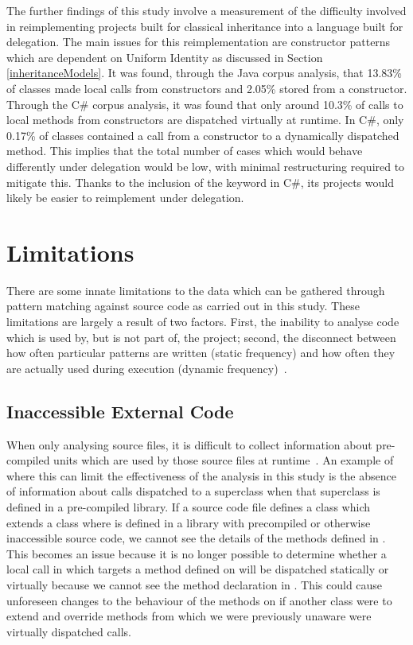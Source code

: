 The further findings of this study involve a measurement of the difficulty involved in reimplementing projects built for classical inheritance into a language built for delegation. The main issues for this reimplementation are constructor patterns which are dependent on Uniform Identity as discussed in Section \ref{inheritanceModels}. It was found, through the Java corpus analysis, that 13.83\% of classes made local calls from constructors and 2.05\% stored  from a constructor. Through the C\# corpus analysis, it was found that only around 10.3\% of calls to local methods from constructors are dispatched virtually at runtime. In C\#, only 0.17\% of classes contained a call from a constructor to a dynamically dispatched method. This implies that the total number of cases which would behave differently under delegation would be low, with minimal restructuring required to mitigate this. Thanks to the inclusion of the  keyword in C\#, its projects would likely be easier to reimplement under delegation.

\section{Limitations}
There are some innate limitations to the data which can be gathered through pattern matching against source code as carried out in this study. These limitations are largely a result of two factors. First, the inability to analyse code which is used by, but is not part of, the project; second, the disconnect between how often particular patterns are written (static frequency) and how often they are actually used during execution (dynamic frequency)~\cite{StaticAnalysisLimits}.

\subsection{Inaccessible External Code}
\label{InaccessibleCode}
When only analysing source files, it is difficult to collect information about pre-compiled units which are used by those source files at runtime~\cite{StaticAnalysisLimits}. An example of where this can limit the effectiveness of the analysis in this study is the absence of information about calls dispatched to a superclass when that superclass is defined in a pre-compiled library. If a source code file defines a class  which extends a class  where  is defined in a library with precompiled or otherwise inaccessible source code, we cannot see the details of the methods defined in . This becomes an \textsl{}issue because it is no longer possible to determine whether a local call in  which targets a method defined on  will be dispatched statically or virtually because we cannot see the method declaration in . This could cause unforeseen changes to the behaviour of the methods on  if another class  were to extend  and override methods from  which we were previously unaware were virtually dispatched calls.

